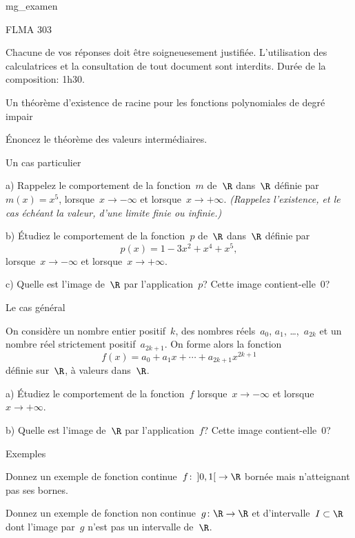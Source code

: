 

\class mg_examen


\module         FLMA 303

\begindirectives
Chacune de vos réponses doit être soigneuesement justifiée.
L'utilisation des calculatrices et la consultation de tout document
sont interdits. Durée de la composition: 1h30.
\enddirectives

\exercise Un théorème d'existence de racine %
             pour les fonctions polynomiales de degré impair

\question
Énoncez le théorème des valeurs intermédiaires.


\question Un cas particulier

\item{a)}
Rappelez le comportement de la fonction~$m$ de~$\R$ dans~$\R$ définie
par~$m(x) = x^5$, lorsque~$x\to-\infty$ et
lorsque~$x\to+\infty$. \em{(Rappelez l'existence, et le cas échéant la
valeur, d'une limite finie ou infinie.)}

\item{b)}
Étudiez le comportement de la fonction~$p$ de~$\R$ dans~$\R$ définie
par
$$
p(x) = 1 - 3x^2 + x^4 + x^5
,
$$
lorsque~$x\to-\infty$ et lorsque~$x\to+\infty$.

\item{c)}
Quelle est l'image de~$\R$ par l'application~$p$? Cette image
contient-elle~$0$?


\question Le cas général

On considère un nombre entier positif~$k$, des nombres réels~$a_0$,
$a_1$, \dots,~$a_{2k}$ et un nombre réel strictement
positif~$a_{2k+1}$. On forme alors la fonction
$$
f(x) = a_0 + a_1 x + \cdots + a_{2k+1} x^{2k+1}
$$
définie sur~$\R$, à valeurs dans~$\R$.

\item{a)}
Étudiez le comportement de la fonction~$f$ lorsque~$x\to-\infty$ et
lorsque~$x\to+\infty$.

\item{b)}
Quelle est l'image de~$\R$ par l'application~$f$? Cette image
contient-elle~$0$?


\exercise Exemples

\question
Donnez un exemple de fonction continue~$f\colon\left]0,1\right[\to\R$ bornée mais
n'atteignant pas ses bornes.

\question
Donnez un exemple de fonction non continue~$g\colon\R\to\R$ et
d'intervalle~$I\subset\R$ dont l'image par~$g$ n'est pas un
intervalle de~$\R$.

